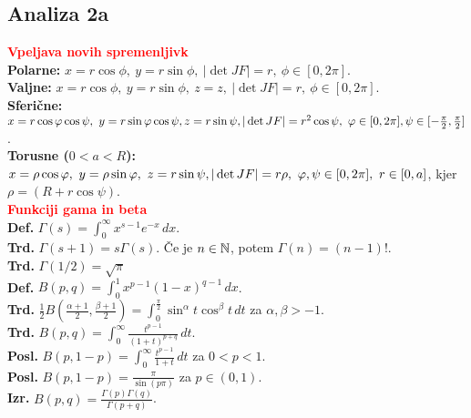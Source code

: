 \documentclass[a4paper,oneside,8pt,landscape]{extarticle}
\begin{document}
\begin{multicols*}{3}
\section{Analiza 2a}
\textbf{\textcolor{red}{Vpeljava novih spremenljivk}}\\
\textbf{Polarne:} \(x = r\cos \phi,\ y = r \sin \phi,\ |\det JF| = r,\ \phi \in [0, 2 \pi]\).\\
\textbf{Valjne:} \(x = r\cos \phi,\ y = r \sin \phi,\ z = z,\ |\det JF| = r,\ \phi \in [0, 2 \pi]\).\\
\textbf{Sferične:} \(x = r \cos \phi \cos \psi,\ y = r \sin\phi \cos\psi, z = r\sin\psi,\\ |\det JF| = r^2 \cos \psi,\ \phi \in [0, 2 \pi], \psi \in [-\frac{\pi}{2}, \frac{\pi}{2}]\).\\
\textbf{Torusne (\(0 < a < R\)):} \(x = \rho \cos \phi,\ y = \rho \sin \phi,\ z = r\sin \psi, \\ |\det JF| = r \rho,\ \phi, \psi \in [0, 2 \pi],\ r \in [0, a]\), kjer \(\rho = (R + r \cos \psi)\).\\
%
%
\textbf{\textcolor{red}{Funkciji gama in beta}}\\
\textbf{Def.} \(\Gamma (s) = \int_{0}^{\infty} x^{s-1}e^{-x} \, dx\).\\
\textbf{Trd.} \(\Gamma(s+1) = s \Gamma(s)\). Če je \(n \in \N\), potem \(\Gamma(n) = (n-1)!\).\\
\textbf{Trd.} \(\Gamma(1/2) = \sqrt{\pi}\)\\
\textbf{Def.} \(B(p,q) = \int_{0}^{1}x^{p-1}(1-x)^{q-1} \, dx\).\\
\textbf{Trd.} \(\frac{1}{2} B(\frac{\alpha + 1}{2}, \frac{\beta + 1}{2}) = \int_{0}^{\frac{\pi}{2}} \sin^\alpha t \cos^\beta t \, dt\) za \(\alpha, \beta > -1\).\\
\textbf{Trd.} \(B(p,q) = \int_{0}^{\infty} \frac{t^{p-1}}{(1+t)^{p+q}} \, dt\).\\
\textbf{Posl.} \(B(p, 1-p) = \int_{0}^{\infty} \frac{t^{p-1}}{1+t} \, dt\) za \(0<p<1\).\\
\textbf{Posl.} \(B(p, 1-p) = \frac{\pi}{\sin (p \pi)}\) za \(p \in (0, 1)\).\\
\textbf{Izr.} \(B(p, q) = \frac{\Gamma(p) \Gamma(q)}{\Gamma(p+q)}\).\\

\end{multicols*}
\end{document}
